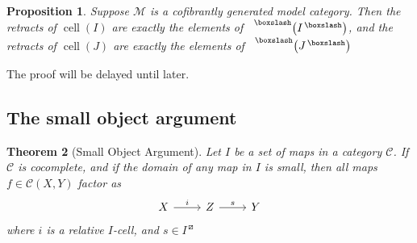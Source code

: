 \documentclass{amsart}
\DeclareMathOperator{\cell}{cell}
\newtheorem{theorem}{Theorem}[subsection]
\newtheorem{proposition}[theorem]{Proposition}
\theoremstyle{definition}
\begin{document}
  \begin{proposition}\label{generators}
    Suppose $\mathcal{M}$ is a cofibrantly generated model category.
    Then the retracts of $\cell(I)$ are exactly the elements of
    \,
    $\prescript{\boxslash}{}{\left( I ^{\,\boxslash}\right)}$,
    and the retracts of $\cell(J)$ are exactly the elements of
    \,
    $\prescript{\boxslash}{}{\left( J ^{\,\boxslash}\right)}$
  \end{proposition}
  The proof will be delayed until later.
  \subsection{The small object argument}

  \begin{theorem}[Small Object Argument]
    Let $I$ be a set of maps in a category $\mathcal{C}$.
    If $\mathcal{C}$ is cocomplete, and if the domain of any map in $I$ is
    small, then all maps $f\in \mathcal{C}(X,Y)$ factor as
    \[
      \begin{tikzcd}
        X\arrow[r, "i"] & Z \arrow[r, "s"] & Y
      \end{tikzcd}
    \]
    where $i$ is a relative $I$-cell, and $s\in I^{\,\boxslash}$ 
  \end{theorem}
\end{document}
